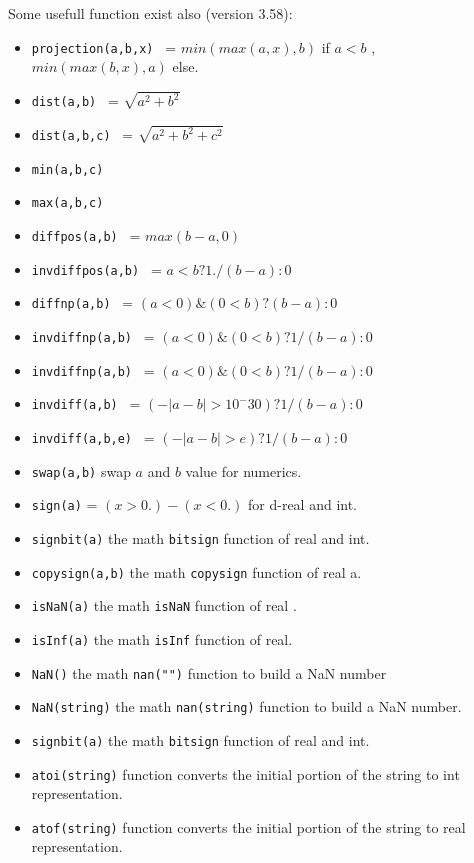 \documentclass[a4paper,twoside,12pt]{book}
\begin{document}
Some usefull function exist also (version 3.58): 
\begin{itemize}
\item \verb!projection(a,b,x) ! = $min(max(a,x),b)$ if $a < b$ ,  $min(max(b,x),a)$ else.
\item \verb!dist(a,b) ! = $\sqrt{a^2+b^2}$
\item \verb!dist(a,b,c) ! = $\sqrt{a^2+b^2+c^2}$
\item \verb!min(a,b,c) ! 
\item \verb!max(a,b,c) ! 
\item \verb!diffpos(a,b) ! = $ max(b-a,0) $
\item \verb!invdiffpos(a,b) ! = $ a<b ? 1./(b-a): 0 $
\item \verb!diffnp(a,b) ! = $ (a<0) \& (0< b)  ? (b-a): 0 $
\item \verb!invdiffnp(a,b) ! = $ (a<0) \& (0< b)  ? 1/(b-a): 0 $
\item \verb!invdiffnp(a,b) ! = $ (a<0) \& (0< b)  ? 1/(b-a): 0 $
\item \verb!invdiff(a,b) ! = $ (-|a-b| > 10^-{30})  ? 1/(b-a): 0 $
\item \verb!invdiff(a,b,e) ! = $ (-|a-b| > e)  ? 1/(b-a): 0 $
\item \verb!swap(a,b)! swap $a$ and $b$ value for numerics. 
\item \verb!sign(a)! = $(x>0.)-(x<0.)$ for d-real and int.  
\item \verb!signbit(a)! the math \texttt {bitsign} function of real and int.  
\item \verb!copysign(a,b)! the math \texttt {copysign} function of real a.   
\item \verb!isNaN(a)! the math \texttt {isNaN} function of real .   
\item \verb!isInf(a)! the math \texttt {isInf} function of real.   
\item \verb!NaN()! the math \texttt {nan("")} function to build a NaN number
\item \verb!NaN(string)! the math \texttt {nan(string)} function to build a NaN number.  

\item \verb!signbit(a)! the math \texttt {bitsign} function of real and int.  
\item \verb!atoi(string)! function converts the initial portion of the string to int representation. 
\item \verb!atof(string)! function converts the initial portion of the string to real representation. 

\end{itemize}
\end{document}
